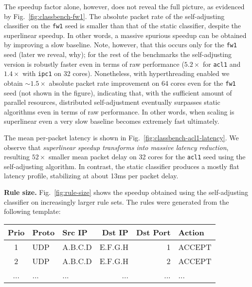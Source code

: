 The speedup factor alone, however, does not reveal the full picture, as evidenced by Fig.~\ref{fig:classbench-fw1}. The absolute packet rate of the self-adjusting classifier on the \texttt{fw1} seed is smaller than that of the static classifier, despite the superlinear speedup. In other words, a massive spurious speedup can be obtained by improving a slow baseline.  Note, however, that this occurs only for the \texttt{fw1} seed (later we reveal, why); for the rest of the benchmarks the self-adjusting version is robustly faster even in terms of raw performance ($5.2\times$ for \texttt{acl1} and $1.4\times$ with \texttt{ipc1} on 32 cores). Nonetheless, with hyperthreading enabled we obtain $\sim\!1.5\times$ absolute packet rate improvement on 64 cores even for the \texttt{fw1} seed (not shown in the figure), indicating that, with the sufficient amount of parallel resources, distributed self-adjustment eventually surpasses static algorithms even in terms of raw performance. In other words, when scaling is superlinear even a very slow baseline becomes extremely fast ultimately.

The mean per-packet latency is shown in Fig.~\ref{fig:classbench-acl1-latency}. We observe that \emph{superlinear speedup transforms into massive latency reduction}, resulting $52\times$ smaller mean packet delay on 32 cores for the \texttt{acl1} seed using the self-adjusting algorithm. In contrast, the static \nftables classifier produces a mostly flat latency profile, stabilizing at about 13ms per packet delay.

\noindent
\textbf{Rule size.} %
Fig.~\ref{fig:rule-size} shows the speedup obtained using the self-adjusting classifier on increasingly larger rule sets. The rules were generated from the following template: 

\noindent %
\begin{small}
  \addtolength{\tabcolsep}{-1pt}    
  \begin{tabular}{c|l|l|r|r|l}
    \textbf{Prio} & \textbf{Proto} & \textbf{Src IP} & \textbf{Dst IP} & \textbf{Dst Port} & \textbf{Action}\\
    \hline
    1 & UDP & A.B.C.D   & E.F.G.H  & 1  & ACCEPT\\
    2 & UDP & A.B.C.D   & E.F.G.H  & 2  & ACCEPT\\
    ... & ... & ...   & ...  & ...  & ...\\
  \end{tabular}
  \addtolength{\tabcolsep}{1pt}
\end{small}

